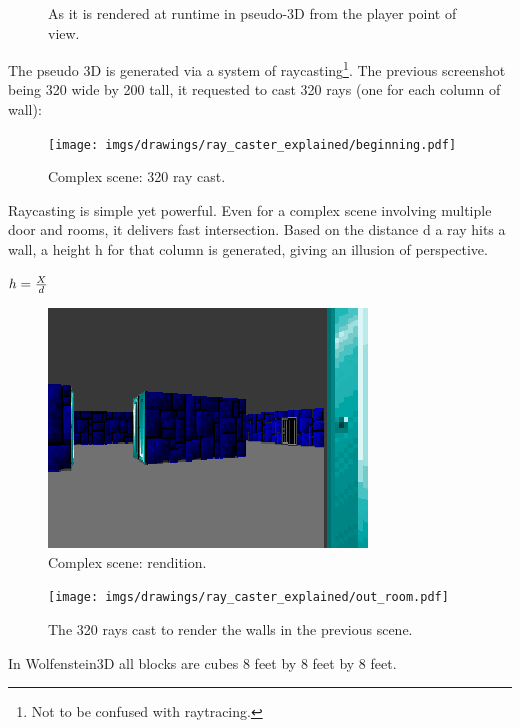 \documentclass[book.tex]{subfiles}
\begin{document}
\begin{figure}[H]
  \centering
 \caption{As it is rendered at runtime in pseudo-3D from the player point of view.} 
\end{figure}

 The pseudo 3D is generated via a system of raycasting\footnote{Not to be confused with raytracing.}. The previous screenshot being 320 wide by 200 tall, it requested to cast 320 rays (one for each column of wall):

\begin{figure}[H]
  \centering
  \texttt{[image: imgs/drawings/ray\_caster\_explained/beginning.pdf]}
 \caption{Complex scene: 320 ray cast.} 
\end{figure}

Raycasting is simple yet powerful. Even for a complex scene involving multiple door and rooms, it delivers fast intersection. Based on the distance d a ray hits a wall, a height h for that column is generated, giving an illusion of perspective.

$ \large h = \frac{X}{d} $

\begin{figure}[H]
  \centering
 \includegraphics[width=\textwidth]{imgs/drawings/ray_caster_explained/out_door.png}
 \caption{Complex scene: rendition.} 
\end{figure}
\par
\begin{figure}[H]
\centering
 \texttt{[image: imgs/drawings/ray\_caster\_explained/out\_room.pdf]}
 \caption{The 320 rays cast to render the walls in the previous scene.} \label{fig:Raycasting2}
\end{figure}
In Wolfenstein3D all blocks are cubes 8 feet by 8 feet by 8 feet.
\end{document}
